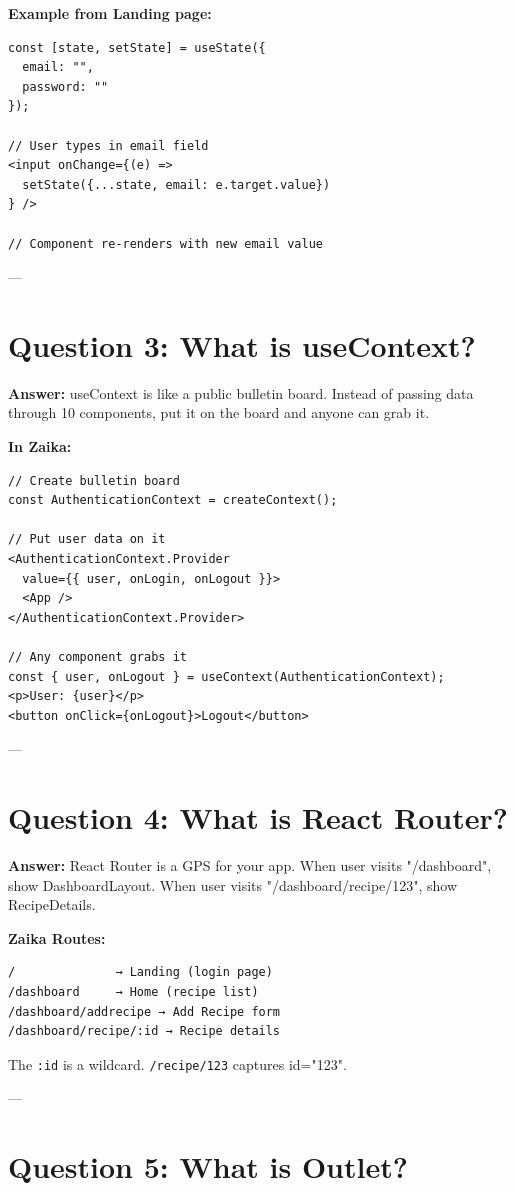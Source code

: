 \documentclass[11pt]{article}
\begin{document}
\textbf{Example from Landing page:}
\begin{lstlisting}
const [state, setState] = useState({ 
  email: "", 
  password: "" 
});

// User types in email field
<input onChange={(e) => 
  setState({...state, email: e.target.value})
} />

// Component re-renders with new email value
\end{lstlisting}

---

\section*{Question 3: What is useContext?}

\textbf{Answer:} useContext is like a public bulletin board. Instead of passing data through 10 components, put it on the board and anyone can grab it.

\textbf{In Zaika:}
\begin{lstlisting}
// Create bulletin board
const AuthenticationContext = createContext();

// Put user data on it
<AuthenticationContext.Provider 
  value={{ user, onLogin, onLogout }}>
  <App />
</AuthenticationContext.Provider>

// Any component grabs it
const { user, onLogout } = useContext(AuthenticationContext);
<p>User: {user}</p>
<button onClick={onLogout}>Logout</button>
\end{lstlisting}

---

\section*{Question 4: What is React Router?}

\textbf{Answer:} React Router is a GPS for your app. When user visits "/dashboard", show DashboardLayout. When user visits "/dashboard/recipe/123", show RecipeDetails.

\textbf{Zaika Routes:}
\begin{lstlisting}
/              → Landing (login page)
/dashboard     → Home (recipe list)
/dashboard/addrecipe → Add Recipe form
/dashboard/recipe/:id → Recipe details
\end{lstlisting}

The \texttt{:id} is a wildcard. \texttt{/recipe/123} captures id="123".

---

\section*{Question 5: What is Outlet?}
\end{document}
